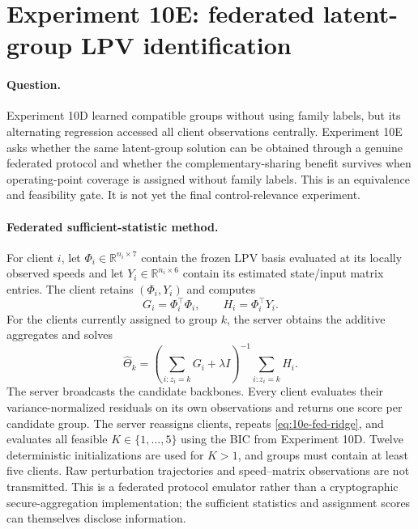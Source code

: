 \section{Experiment 10E: federated latent-group LPV identification}
\label{sec:experiment10e}

\paragraph{Question.}
Experiment 10D learned compatible groups without using family labels, but its
alternating regression accessed all client observations centrally. Experiment
10E asks whether the same latent-group solution can be obtained through a
genuine federated protocol and whether the complementary-sharing benefit
survives when operating-point coverage is assigned without family labels. This
is an equivalence and feasibility gate. It is not yet the final
control-relevance experiment.

\paragraph{Federated sufficient-statistic method.}
For client $i$, let $\Phi_i\in\mathbb{R}^{n_i\times 7}$ contain the frozen LPV
basis evaluated at its locally observed speeds and let
$Y_i\in\mathbb{R}^{n_i\times 6}$ contain its estimated state/input matrix
entries. The client retains $(\Phi_i,Y_i)$ and computes
\begin{equation}
 G_i=\Phi_i^\top\Phi_i,\qquad H_i=\Phi_i^\top Y_i.
\end{equation}
For the clients currently assigned to group $k$, the server obtains the
additive aggregates and solves
\begin{equation}
 \widehat\Theta_k=
 \left(\sum_{i:z_i=k}G_i+\lambda I\right)^{-1}
 \sum_{i:z_i=k}H_i .
 \label{eq:10e-fed-ridge}
\end{equation}
The server broadcasts the candidate backbones. Every client evaluates their
variance-normalized residuals on its own observations and returns one score per
candidate group. The server reassigns clients, repeats
\cref{eq:10e-fed-ridge}, and evaluates all feasible
$K\in\{1,\ldots,5\}$ using the BIC from Experiment 10D. Twelve deterministic
initializations are used for $K>1$, and groups must contain at least five
clients. Raw perturbation trajectories and speed--matrix observations are not
transmitted. This is a federated protocol emulator rather than a cryptographic
secure-aggregation implementation; the sufficient statistics and assignment
scores can themselves disclose information.


